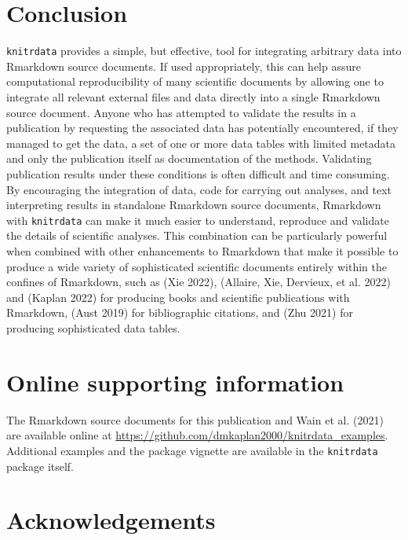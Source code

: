 \hypertarget{conclusion}{%
\section{Conclusion}\label{conclusion}}

\texttt{knitrdata} provides a simple, but effective, tool for integrating arbitrary data into Rmarkdown source documents. If used appropriately, this can help assure computational reproducibility of many scientific documents by allowing one to integrate all relevant external files and data directly into a single Rmarkdown source document. Anyone who has attempted to validate the results in a publication by requesting the associated data has potentially encountered, if they managed to get the data, a set of one or more data tables with limited metadata and only the publication itself as documentation of the methods. Validating publication results under these conditions is often difficult and time consuming. By encouraging the integration of data, code for carrying out analyses, and text interpreting results in standalone Rmarkdown source documents, Rmarkdown with \texttt{knitrdata} can make it much easier to understand, reproduce and validate the details of scientific analyses. This combination can be particularly powerful when combined with other enhancements to Rmarkdown that make it possible to produce a wide variety of sophisticated scientific documents entirely within the confines of Rmarkdown, such as  (Xie 2022),  (Allaire, Xie, Dervieux, et al. 2022) and  (Kaplan 2022) for producing books and scientific publications with Rmarkdown,  (Aust 2019) for bibliographic citations, and  (Zhu 2021) for producing sophisticated data tables.

\hypertarget{online-supporting-information}{%
\section{Online supporting information}\label{online-supporting-information}}

The Rmarkdown source documents for this publication and Wain et al. (2021) are available online at \url{https://github.com/dmkaplan2000/knitrdata_examples}. Additional examples and the package vignette are available in the \texttt{knitrdata} package itself.

\hypertarget{acknowledgements}{%
\section{Acknowledgements}\label{acknowledgements}}

